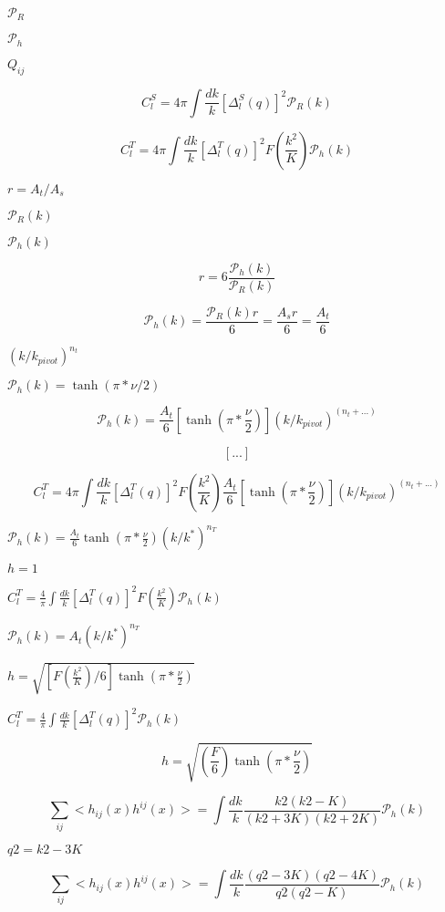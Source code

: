 \documentclass{article}
\begin{document}
$ \mathcal{P}_R$
\pagebreak

$ \mathcal{P}_h$
\pagebreak

$ Q_{ij}$
\pagebreak

\[ C_l^S = 4\pi \int \frac{dk}{k} [\Delta_l^S(q)]^2 \mathcal{P}_R(k) \]
\pagebreak

\[ C_l^T = 4\pi \int \frac{dk}{k} [\Delta_l^T(q)]^2 F\left(\frac{k^2}{K}\right) \mathcal{P}_h(k) \]
\pagebreak

$ r = A_t / A_s $
\pagebreak

$ \mathcal{P}_R(k)$
\pagebreak

$ \mathcal{P}_h(k)$
\pagebreak

\[ r = 6 \frac{\mathcal{P}_h(k)}{\mathcal{P}_R(k)} \]
\pagebreak

\[ \mathcal{P}_h(k) = \frac{\mathcal{P}_R(k) r}{6} = \frac{A_s r}{6} = \frac{A_t}{6} \]
\pagebreak

$ (k/k_{pivot})^{n_t} $
\pagebreak

$ \mathcal{P}_h(k)=\tanh(\pi*\nu/2)$
\pagebreak

\[ \mathcal{P}_h(k) = \frac{A_t}{6} [ \tanh(\pi*\frac{\nu}{2})] (k/k_{pivot})^{(n_t+...)}\]
\pagebreak

\[ [...] \]
\pagebreak

\[ C_l^T = 4\pi \int \frac{dk}{k} [\Delta_l^T(q)]^2 F\left(\frac{k^2}{K}\right) \frac{A_t}{6} [\tanh(\pi*\frac{\nu}{2})] (k/k_{pivot})^{(n_t+...)} \]
\pagebreak

$ \mathcal{P}_h(k) = \frac{A_t}{6} \tanh{(\pi*\frac{\nu}{2})} (k/k^*)^{n_T}$
\pagebreak

$ h = 1$
\pagebreak

$ C_l^T = \frac{4}{\pi} \int \frac{dk}{k} [\Delta_l^T(q)]^2 F\left(\frac{k^2}{K}\right) \mathcal{P}_h(k) $
\pagebreak

$ \mathcal{P}_h(k) = A_t (k/k^*)^{n_T} $
\pagebreak

$ h = \sqrt{[F\left(\frac{k^2}{K}\right) / 6] \tanh{(\pi*\frac{\nu}{2})}} $
\pagebreak

$ C_l^T = \frac{4}{\pi} \int \frac{dk}{k} [\Delta_l^T(q)]^2 \mathcal{P}_h(k) $
\pagebreak

\[ h = \sqrt{\left(\frac{F}{6}\right) \tanh{(\pi*\frac{\nu}{2})}} \]
\pagebreak

\[ \sum_{ij}<h_{ij}(x) h^{ij}(x)> = \int \frac{dk}{k} \frac{k2(k2-K)}{(k2+3K)(k2+2K)} \mathcal{P}_h(k) \]
\pagebreak

$ q2 = k2 - 3K $
\pagebreak

\[ \sum_{ij}<h_{ij}(x) h^{ij}(x)> = \int \frac{dk}{k} \frac{(q2-3K)(q2-4K)}{q2(q2-K)} \mathcal{P}_h(k) \]
\pagebreak
\end{document}
